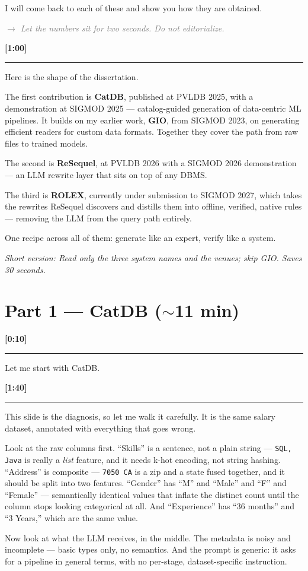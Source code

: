 \documentclass[11pt]{article}
\newcommand{\slide}[3]{%
  \vspace{3mm}%
  \noindent{\large\textbf{\textcolor{deepblue}{#1}~~#2}}%
  \hfill{\small\textcolor{tug}{\textbf{[#3]}}}\\[-1mm]
  \rule{\linewidth}{0.4pt}\par\vspace{1mm}}
\newcommand{\cover}[2]{%
  \vspace{3mm}%
  \noindent{\large\textbf{\textcolor{darkgreen}{#1}}}%
  \hfill{\small\textcolor{tug}{\textbf{[#2]}}}\\[-1mm]
  \rule{\linewidth}{0.4pt}\par\vspace{1mm}}
\newcommand{\cue}[1]{\par\vspace{1.2mm}\noindent%
  \textit{\small\textcolor{gray}{$\rightarrow$ #1}}\par}
\newcommand{\cut}[1]{\par\vspace{1.2mm}\noindent%
  \textit{\small\textcolor{tug}{Short version: #1}}\par}
\begin{document}
I will come back to each of these and show you how they are obtained.
\cue{Let the numbers sit for two seconds. Do not editorialize.}

\slide{Slide 9}{Thesis Contributions}{1:00}
Here is the shape of the dissertation.

The first contribution is \textbf{CatDB}, published at PVLDB 2025, with a
demonstration at SIGMOD 2025 --- catalog-guided generation of data-centric ML
pipelines. It builds on my earlier work, \textbf{GIO}, from SIGMOD 2023, on
generating efficient readers for custom data formats. Together they cover the
path from raw files to trained models.

The second is \textbf{ReSequel}, at PVLDB 2026 with a SIGMOD 2026
demonstration --- an LLM rewrite layer that sits on top of any DBMS.

The third is \textbf{ROLEX}, currently under submission to SIGMOD 2027, which
takes the rewrites ReSequel discovers and distills them into offline,
verified, native rules --- removing the LLM from the query path entirely.

One recipe across all of them: generate like an expert, verify like a system.
\cut{Read only the three system names and the venues; skip GIO. Saves 30
seconds.}

\section*{Part 1 — CatDB ($\sim$11 min)}

\cover{CatDB paper cover}{0:10}
Let me start with CatDB.

\slide{Slide 10}{Motivation for CatDB}{1:40}
This slide is the diagnosis, so let me walk it carefully. It is the same
salary dataset, annotated with everything that goes wrong.

Look at the raw columns first. ``Skills'' is a sentence, not a plain string ---
\texttt{SQL, Java} is really a \emph{list} feature, and it needs k-hot
encoding, not string hashing. ``Address'' is composite --- \texttt{7050 CA} is
a zip and a state fused together, and it should be split into two features.
``Gender'' has ``M'' and ``Male'' and ``F'' and ``Female'' --- semantically
identical values that inflate the distinct count until the column stops
looking categorical at all. And ``Experience'' has ``36 months'' and ``3
Years,'' which are the same value.

Now look at what the LLM receives, in the middle. The metadata is noisy and
incomplete --- basic types only, no semantics. And the prompt is generic: it
asks for a pipeline in general terms, with no per-stage, dataset-specific
instruction.
\end{document}
